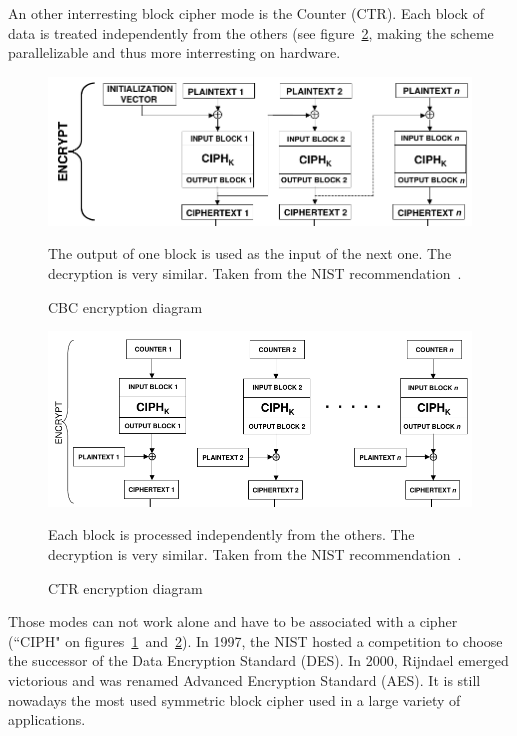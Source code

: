 \indent An other interresting block cipher mode is the Counter (CTR).
Each block of data is treated independently from the others (see figure~\ref{fig:ctr-encrypt}, making the scheme parallelizable and thus more interresting on hardware.

\begin{figure}
\includegraphics[width=\textwidth]{nist-cbc}
\caption{CBC encryption diagram}{The output of one block is used as the input of the next one. The decryption is very similar. Taken from the NIST recommendation~\cite{nist-sp800-38A}.}
\label{fig:cbc-encrypt}
\end{figure}

\begin{figure}
\includegraphics[width=\textwidth]{nist-ctr}
\caption{CTR encryption diagram}{Each block is processed independently from the others. The decryption is very similar. Taken from the NIST recommendation~\cite{nist-sp800-38A}.}
\label{fig:ctr-encrypt}
\end{figure}

Those modes can not work alone and have to be associated with a cipher (``CIPH" on figures~\ref{fig:cbc-encrypt}~and~\ref{fig:ctr-encrypt}).
In 1997, the NIST hosted a competition to choose the successor of the Data Encryption Standard (DES).
In 2000, Rijndael emerged victorious and was renamed Advanced Encryption Standard (AES).
It is still nowadays the most used symmetric block cipher used in a large variety of applications.\newline{}

